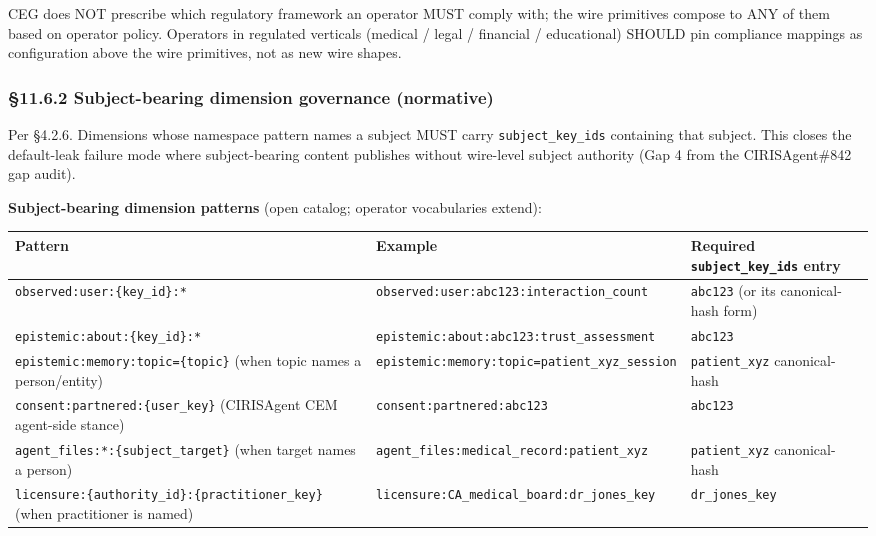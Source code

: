 \documentclass[11pt]{article}
\begin{document}
CEG does NOT prescribe which regulatory framework an operator MUST comply with; the wire primitives compose to ANY of them based on operator policy. Operators in regulated verticals (medical / legal / financial / educational) SHOULD pin compliance mappings as configuration above the wire primitives, not as new wire shapes.


\subsubsection*{§11.6.2 Subject-bearing dimension governance (normative)}


Per §4.2.6. Dimensions whose namespace pattern names a subject MUST carry \texttt{subject\_key\_ids} containing that subject. This closes the default-leak failure mode where subject-bearing content publishes without wire-level subject authority (Gap 4 from the CIRISAgent\#842 gap audit).


\textbf{Subject-bearing dimension patterns} (open catalog; operator vocabularies extend):


{\footnotesize
\begin{longtable}{|p{5.33cm}|p{5.33cm}|p{5.33cm}|}\hline
\textbf{Pattern} & \textbf{Example} & \textbf{Required \texttt{subject\_key\_ids} entry} \\ \hline\endhead
\texttt{observed:user:\{key\_id\}:*} & \texttt{observed:user:abc123:interaction\_count} & \texttt{abc123} (or its canonical-hash form) \\ \hline
\texttt{epistemic:about:\{key\_id\}:*} & \texttt{epistemic:about:abc123:trust\_assessment} & \texttt{abc123} \\ \hline
\texttt{epistemic:memory:topic=\{topic\}} (when topic names a person/entity) & \texttt{epistemic:memory:topic=patient\_xyz\_session} & \texttt{patient\_xyz} canonical-hash \\ \hline
\texttt{consent:partnered:\{user\_key\}} (CIRISAgent CEM agent-side stance) & \texttt{consent:partnered:abc123} & \texttt{abc123} \\ \hline
\texttt{agent\_files:*:\{subject\_target\}} (when target names a person) & \texttt{agent\_files:medical\_record:patient\_xyz} & \texttt{patient\_xyz} canonical-hash \\ \hline
\texttt{licensure:\{authority\_id\}:\{practitioner\_key\}} (when practitioner is named) & \texttt{licensure:CA\_medical\_board:dr\_jones\_key} & \texttt{dr\_jones\_key} \\ \hline
\end{longtable}}
\end{document}

